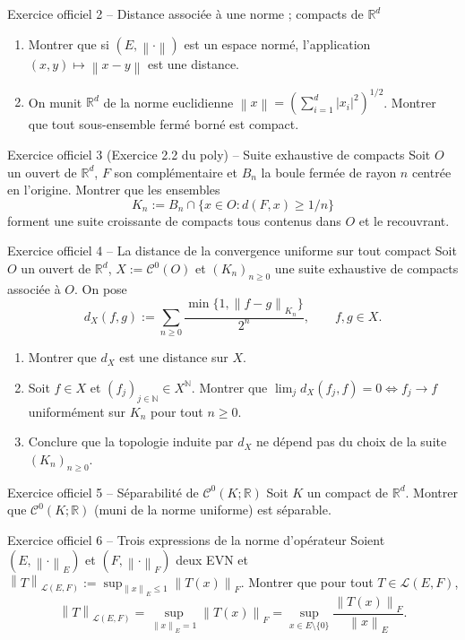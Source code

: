 \documentclass[11pt,a4paper]{article}
\newcommand{\R}{\mathbb{R}}
\newcommand{\N}{\mathbb{N}}
\newcommand{\norm}[1]{\left\|#1\right\|}
\newcommand{\Lc}{\mathcal{L}}
\newcommand{\Cz}{\mathcal{C}^0}
\theoremstyle{definition}
\begin{document}
\begin{exo}{Exercice officiel 2 -- Distance associée à une norme ; compacts de $\R^d$}
\begin{enumerate}[label=(\alph*)]
  \item Montrer que si $(E,\norm\cdot)$ est un espace normé, l'application $(x,y)\mapsto\norm{x-y}$ est une distance.
  \item On munit $\R^d$ de la norme euclidienne $\norm x=(\sum_{i=1}^d|x_i|^2)^{1/2}$. Montrer que tout sous-ensemble fermé borné est compact.
\end{enumerate}
\end{exo}

\begin{exo}{Exercice officiel 3 (Exercice 2.2 du poly) -- Suite exhaustive de compacts}
Soit $O$ un ouvert de $\R^d$, $F$ son complémentaire et $B_n$ la boule fermée de rayon $n$ centrée en l'origine. Montrer que les ensembles
\[
K_n:=B_n\cap\{x\in O : d(F,x)\ge1/n\}
\]
forment une suite croissante de compacts tous contenus dans $O$ et le recouvrant.
\end{exo}

\begin{exo}{Exercice officiel 4 -- La distance de la convergence uniforme sur tout compact}
Soit $O$ un ouvert de $\R^d$, $X:=\Cz(O)$ et $(K_n)_{n\ge0}$ une suite exhaustive de compacts associée à $O$. On pose
\[
d_X(f,g):=\sum_{n\ge0}\frac{\min\{1,\norm{f-g}_{K_n}\}}{2^n},\qquad f,g\in X .
\]
\begin{enumerate}[label=(\alph*)]
  \item Montrer que $d_X$ est une distance sur $X$.
  \item Soit $f\in X$ et $(f_j)_{j\in\N}\in X^\N$. Montrer que $\lim_jd_X(f_j,f)=0\iff f_j\to f$ uniformément sur $K_n$ pour tout $n\ge0$.
  \item Conclure que la topologie induite par $d_X$ ne dépend pas du choix de la suite $(K_n)_{n\ge0}$.
\end{enumerate}
\end{exo}

\begin{exo}{Exercice officiel 5 -- Séparabilité de $\Cz(K;\R)$}
Soit $K$ un compact de $\R^d$. Montrer que $\Cz(K;\R)$ (muni de la norme uniforme) est séparable.
\end{exo}

\begin{exo}{Exercice officiel 6 -- Trois expressions de la norme d'opérateur}
Soient $(E,\norm\cdot_E)$ et $(F,\norm\cdot_F)$ deux EVN et $\norm T_{\Lc(E,F)}:=\sup_{\norm x_E\le1}\norm{T(x)}_F$. Montrer que pour tout $T\in\Lc(E,F)$,
\[
\norm T_{\Lc(E,F)}=\sup_{\norm x_E=1}\norm{T(x)}_F=\sup_{x\in E\setminus\{0\}}\frac{\norm{T(x)}_F}{\norm x_E}.
\]
\end{exo}
\end{document}
